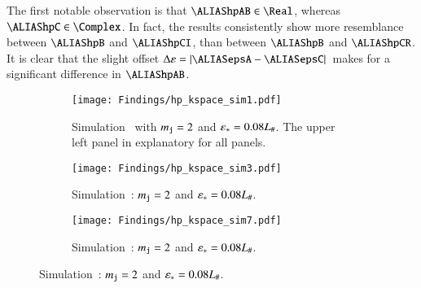     The first notable observation is that $\hpAB\in \Real$, whereas $\hpC\in \Complex$. In fact, the results consistently show more resemblance between $\hpB$ and $\hpCI$, than between $\hpB$ and $\hpCR$. It is clear that the slight offset $\Delta \varepsilon = \abs*{\epsA-\epsC}$ makes for a significant difference in $\hpAB$. %
    \begin{figure}[hb!]
        \centering
        \begin{subfigure}[b]{\linewidth}
            \centering
            \texttt{[image: Findings/hp\_kspace\_sim1.pdf]}
        \caption{Simulation~ with $m_{\mathtt{j}}=2$ and $\varepsilon_\ast=0.08L_\#$. The upper left panel in explanatory for all panels.}
        \label{fig:results:h11:hp_kspace_sim1}
        \end{subfigure}
        \hfill
        \begin{subfigure}[b]{\linewidth}
            \centering
            \texttt{[image: Findings/hp\_kspace\_sim3.pdf]}
        \caption{Simulation~: $m_{\mathtt{j}}=2$ and $\varepsilon_\ast=0.08L_\#$.}
        \label{fig:results:h11:hp_kspace_sim3}
        \end{subfigure}
        \hfill
        \begin{subfigure}[b]{\linewidth}
            \centering
            \texttt{[image: Findings/hp\_kspace\_sim7.pdf]}
        \caption{Simulation~: $m_{\mathtt{j}}=2$ and $\varepsilon_\ast=0.08L_\#$.}
        \label{fig:results:h11:hp_kspace_sim7}
        \end{subfigure}
    \end{figure}
